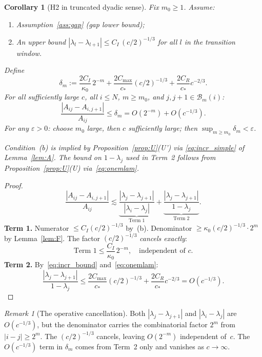 \documentclass[12pt]{amsart}
\newtheorem{corollary}[theorem]{Corollary}
\theoremstyle{definition}
\theoremstyle{remark}
\newtheorem{remark}[theorem]{Remark}
\newcommand{\Bm}{\mathcal{B}_m}
\begin{document}
\begin{corollary}[H2 in truncated dyadic sense]
\label{cor:C}
Fix $m_0\ge 1$.
Assume:
\begin{enumerate}[\textup{(a)}]
\item Assumption~\ref{ass:gap} (gap lower bound);
\item An upper bound
  $|\lambda_l - \lambda_{l+1}| \le C_I\,(c/2)^{-1/3}$
  for all $l$ in the transition window.
\end{enumerate}
Define
\[
  \delta_m
  := \frac{2C_I}{\kappa_0}\,2^{-m}
  + \frac{2C_{\max}}{c_*}(c/2)^{-1/3}
  + \frac{2C_R}{c_*}c^{-2/3}.
\]
For all sufficiently large $c$, all $i \le N$,
$m \ge m_0$, and $j,j+1 \in \Bm(i)$:
\[
  \frac{|A_{ij}-A_{i,j+1}|}{A_{ij}}
  \le \delta_m = O(2^{-m})+O(c^{-1/3}).
\]
For any $\varepsilon>0$: choose $m_0$ large, then $c$
sufficiently large; then $\sup_{m\ge m_0}\delta_m<\varepsilon$.

\smallskip\noindent
\emph{Condition~\textup{(b)} is implied by
Proposition~\ref{prop:U}\textup{(U')} via
\eqref{eq:incr_simple} of Lemma~\ref{lem:A}.
The bound on $1-\lambda_j$ used in Term~2 follows
from Proposition~\ref{prop:U}\textup{(U)}
via~\eqref{eq:onemlam}.}
\end{corollary}

\begin{proof}
\[
\frac{|A_{ij}-A_{i,j+1}|}{A_{ij}}
\lesssim
\underbrace{\frac{|\lambda_j-\lambda_{j+1}|}
            {|\lambda_i-\lambda_j|}}_{\text{Term 1}}
+
\underbrace{\frac{|\lambda_j-\lambda_{j+1}|}
            {1-\lambda_j}}_{\text{Term 2}}.
\]
\textbf{Term 1.}
Numerator $\le C_I(c/2)^{-1/3}$ by~(b).
Denominator $\ge \kappa_0(c/2)^{-1/3}\cdot 2^m$
by Lemma~\ref{lem:F}.
The factor $(c/2)^{-1/3}$ \emph{cancels exactly}:
\[
  \text{Term 1} \le \frac{C_I}{\kappa_0}\,2^{-m},
  \quad\text{independent of }c.
\]
\textbf{Term 2.}
By~\eqref{eq:incr_bound} and~\eqref{eq:onemlam}:
\[
  \frac{|\lambda_j-\lambda_{j+1}|}{1-\lambda_j}
  \le \frac{2C_{\max}}{c_*}(c/2)^{-1/3}
  + \frac{2C_R}{c_*}c^{-2/3} = O(c^{-1/3}).
\]
\end{proof}

\begin{remark}[The operative cancellation]
\label{rem:dyadic}
Both $|\lambda_j-\lambda_{j+1}|$ and $|\lambda_i-\lambda_j|$
are $O(c^{-1/3})$, but the denominator carries
the combinatorial factor $2^m$ from $|i-j|\ge 2^m$.
The $(c/2)^{-1/3}$ cancels, leaving $O(2^{-m})$
independent of~$c$.
The $O(c^{-1/3})$ term in $\delta_m$ comes from
Term~2 only and vanishes as $c\to\infty$.
\end{remark}
\end{document}
